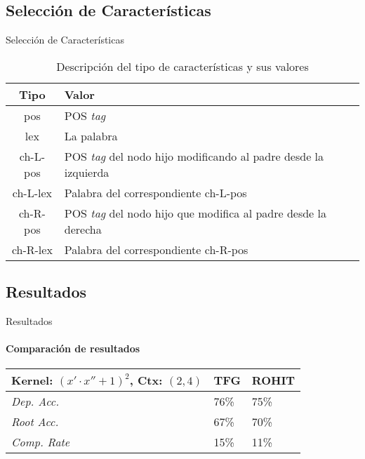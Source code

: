 \documentclass[utf8,draft]{beamer}
\begin{document}
\subsection*{Selección de Características}
\begin{frame}{Selección de Características}
\begin{table}[b!]
  \caption{Descripción del tipo de características y sus valores}
  
  \begin{tabularx}{\textwidth}{cp{}}
    \toprule
    Tipo     & Valor                                                                \\
    \toprule
    pos      & POS \emph{tag}                                                       \\
    lex      & La palabra                                                           \\
    ch-L-pos & POS \emph{tag} del nodo hijo modificando al padre desde la izquierda \\
    ch-L-lex & Palabra del correspondiente ch-L-pos                                 \\
    ch-R-pos & POS \emph{tag} del nodo hijo que modifica al padre desde la derecha  \\
    ch-R-lex & Palabra del correspondiente ch-R-pos                                 \\
    \bottomrule
  \end{tabularx}
\end{table}  
\end{frame}


\subsection*{Resultados}


\begin{frame}{Resultados}
  \framesubtitle{Comparación de resultados}
  \begin{table}[b!]
  \begin{tabularx}{.82\textwidth}{p{}|p{}p{}}
    Kernel: $(x'\cdot x'' + 1)^2$, Ctx: $(2,4)$ & TFG & ROHIT \\
    \toprule
    \emph{Dep. Acc.}  & 76\%   & 75\% \\
    \emph{Root Acc.}  & 67\%   & 70\% \\
    \emph{Comp. Rate} & 15\%   & 11\% \\
    \bottomrule
  \end{tabularx}
  \end{table}
\end{frame}
\end{document}
